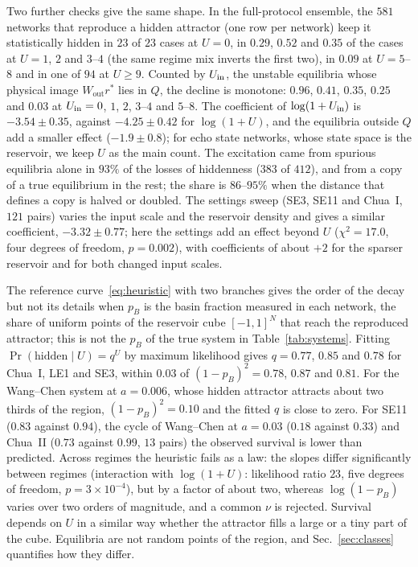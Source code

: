 Two further checks give the same shape. In the full-protocol ensemble, the $581$ networks that reproduce a hidden attractor
(one row per network) keep it statistically hidden in $23$ of $23$ cases at $U=0$, in $0.29$, $0.52$ and $0.35$ of the cases at
$U=1$, $2$ and $3$--$4$ (the same regime mix inverts the first two), in $0.09$ at $U=5$--$8$ and in one of $94$ at $U\ge9$.
Counted by $U_{\mathrm{in}}$, the unstable equilibria whose physical image $W_{\mathrm{out}}r^*$ lies in $Q$, the decline is monotone:
$0.96$, $0.41$, $0.35$, $0.25$ and $0.03$ at $U_{\mathrm{in}}=0$, $1$, $2$, $3$--$4$ and $5$--$8$. The coefficient of $\log(1+U_{\mathrm{in}})$
is $-3.54\pm0.35$, against $-4.25\pm0.42$ for $\log(1+U)$, and the equilibria outside $Q$ add a smaller effect
($-1.9\pm0.8$); for echo state networks, whose state space is the reservoir, we keep $U$ as the main count. The excitation
came from spurious equilibria alone in $93\%$ of the losses of hiddenness ($383$ of $412$), and from a copy of a true
equilibrium in the rest; the share is $86$--$95\%$ when the distance that defines a copy is halved or doubled. The settings
sweep (SE3, SE11 and Chua~I, $121$ pairs) varies the input scale and the reservoir density and gives a similar coefficient,
$-3.32\pm0.77$; here the settings add an effect beyond $U$ ($\chi^2=17.0$, four degrees of freedom, $p=0.002$), with
coefficients of about $+2$ for the sparser reservoir and for both changed input scales.

The reference curve~\eqref{eq:heuristic} with two branches gives the order of the decay but not its details when $p_B$ is
the basin fraction measured in each network, the share of uniform points of the reservoir cube $[-1,1]^N$ that reach the
reproduced attractor; this is not the $p_B$ of the true system in Table~\ref{tab:systems}. Fitting $\Pr(\text{hidden}\mid U)=q^U$ by maximum likelihood gives $q=0.77$, $0.85$ and
$0.78$ for Chua~I, LE1 and SE3, within $0.03$ of $(1-p_B)^2=0.78$, $0.87$ and $0.81$. For the Wang--Chen system at $a=0.006$,
whose hidden attractor attracts about two thirds of the region, $(1-p_B)^2=0.10$ and the fitted $q$ is close to zero. For SE11
($0.83$ against $0.94$), the cycle of Wang--Chen at $a=0.03$ ($0.18$ against $0.33$) and Chua~II ($0.73$ against $0.99$, $13$
pairs) the observed survival is lower than predicted. Across regimes the heuristic fails as a law: the slopes differ
significantly between regimes (interaction with $\log(1+U)$: likelihood ratio $23$, five degrees of freedom, $p=3\times10^{-4}$),
but by a factor of about two, whereas $\log(1-p_B)$ varies over two orders of magnitude, and a common $\nu$ is rejected.
Survival depends on $U$ in a similar way whether the attractor fills a large or a tiny part of the cube. Equilibria are not
random points of the region, and Sec.~\ref{sec:classes} quantifies how they differ.

